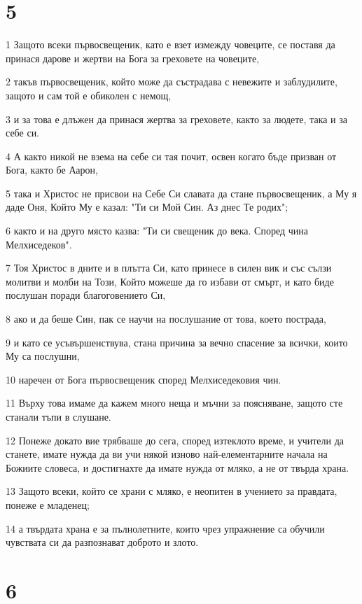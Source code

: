 \chapter{5}

\par 1 Защото всеки първосвещеник, като е взет измежду човеците, се поставя да принася дарове и жертви на Бога за греховете на човеците,
\par 2 такъв първосвещеник, който може да състрадава с невежите и заблудилите, защото и сам той е обиколен с немощ,
\par 3 и за това е длъжен да принася жертва за греховете, както за людете, така и за себе си.
\par 4 А както никой не взема на себе си тая почит, освен когато бъде призван от Бога, както бе Аарон,
\par 5 така и Христос не присвои на Себе Си славата да стане първосвещеник, а Му я даде Оня, Който Му е казал: "Ти си Мой Син. Аз днес Те родих";
\par 6 както и на друго място казва: "Ти си свещеник до века. Според чина Мелхиседеков".
\par 7 Тоя Христос в дните и в плътта Си, като принесе в силен вик и със сълзи молитви и молби на Този, Който можеше да го избави от смърт, и като биде послушан поради благоговението Си,
\par 8 ако и да беше Син, пак се научи на послушание от това, което пострада,
\par 9 и като се усъвършенствува, стана причина за вечно спасение за всички, които Му са послушни,
\par 10 наречен от Бога първосвещеник според Мелхиседековия чин.
\par 11 Върху това имаме да кажем много неща и мъчни за поясняване, защото сте станали тъпи в слушане.
\par 12 Понеже докато вие трябваше до сега, според изтеклото време, и учители да станете, имате нужда да ви учи някой изново най-елементарните начала на Божиите словеса, и достигнахте да имате нужда от мляко, а не от твърда храна.
\par 13 Защото всеки, който се храни с мляко, е неопитен в учението за правдата, понеже е младенец;
\par 14 а твърдата храна е за пълнолетните, които чрез упражнение са обучили чувствата си да разпознават доброто и злото.

\chapter{6}

